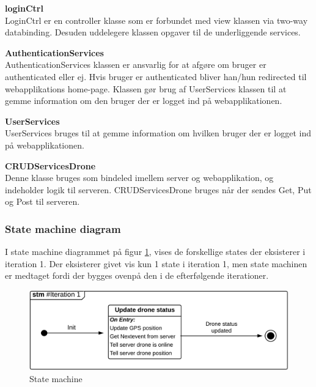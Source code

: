 \textbf{loginCtrl} \\
LoginCtrl er en controller klasse som er forbundet med view klassen via two-way databinding. Desuden uddelegere klassen opgaver til de underliggende services.

\textbf{AuthenticationServices} \\
AuthenticationServices klassen er ansvarlig for at afgøre om bruger er authenticated eller ej. Hvis bruger er authenticated bliver han/hun redirected til webapplikations home-page. Klassen gør brug af UserServices klassen til at gemme information om den bruger der er logget ind på webapplikationen.

\textbf{UserServices}\\
UserServices bruges til at gemme information om hvilken bruger der er logget ind på webapplikationen.

\textbf{CRUDServicesDrone} \\
Denne klasse bruges som bindeled imellem server og webapplikation, og indeholder logik til serveren. CRUDServicesDrone bruges når der sendes Get, Put og Post til serveren.


\subsubsection*{State machine diagram}
\vspace{-0.1cm}
I state machine diagrammet på figur \ref{fig:Statemachine_iteration1}, vises de forskellige states der eksisterer i iteration 1. Der eksisterer givet vis kun 1 state i iteration 1, men state machinen er medtaget fordi der bygges ovenpå den i de efterfølgende iterationer.
\begin{figure}[H]
	\centering
	\includegraphics[width=1\textwidth]{Billeder/statemachine/State_iteration1.png}
	\vspace{-0.5cm}
	\caption{State machine}
	\label{fig:Statemachine_iteration1}
\end{figure}
